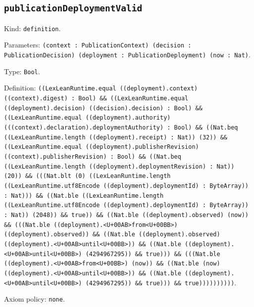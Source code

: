 \documentclass[11pt]{article}
\begin{document}
\subsection*{\texttt{publicationDeploymentValid}}
\noindent Kind: \texttt{definition}.\par
\noindent Parameters: \texttt{(context : PublicationContext) (decision : PublicationDecision) (deployment : PublicationDeployment) (now : Nat)}.\par
\noindent Type: \texttt{Bool}.\par
\noindent Definition: \texttt{((LexLeanRuntime.equal ((deployment).context) ((context).digest) : Bool) \&\& ((LexLeanRuntime.equal ((deployment).decision) ((decision).decision) : Bool) \&\& ((LexLeanRuntime.equal ((deployment).authority) (((context).declaration).deploymentAuthority) : Bool) \&\& ((Nat.beq ((LexLeanRuntime.length ((deployment).receipt) : Nat)) (32)) \&\& ((LexLeanRuntime.equal ((deployment).publisherRevision) ((context).publisherRevision) : Bool) \&\& ((Nat.beq ((LexLeanRuntime.length ((deployment).deploymentRevision) : Nat)) (20)) \&\& (((Nat.blt (0) ((LexLeanRuntime.length ((LexLeanRuntime.utf8Encode ((deployment).deploymentId) : ByteArray)) : Nat))) \&\& ((Nat.ble ((LexLeanRuntime.length ((LexLeanRuntime.utf8Encode ((deployment).deploymentId) : ByteArray)) : Nat)) (2048)) \&\& true)) \&\& ((Nat.ble ((deployment).observed) (now)) \&\& (((Nat.ble ((deployment).<U+00AB>from<U+00BB>) ((deployment).observed)) \&\& ((Nat.ble ((deployment).observed) ((deployment).<U+00AB>until<U+00BB>)) \&\& ((Nat.ble ((deployment).<U+00AB>until<U+00BB>) (4294967295)) \&\& true))) \&\& (((Nat.ble ((deployment).<U+00AB>from<U+00BB>) (now)) \&\& ((Nat.ble (now) ((deployment).<U+00AB>until<U+00BB>)) \&\& ((Nat.ble ((deployment).<U+00AB>until<U+00BB>) (4294967295)) \&\& true))) \&\& true))))))))))}.\par
\noindent Axiom policy: \texttt{none}.\par
\end{document}
